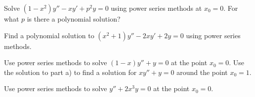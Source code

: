 \begin{exercise}
\leavevmode
\begin{tasks}
\task Solve $(1-x^2)y''-xy' + p^2y = 0$ using power series methods at $x_0=0$.
\task For what $p$ is there a polynomial solution?
\end{tasks}
\end{exercise}

\begin{exercise}
Find a polynomial solution to $(x^2+1) y''-2xy'+2y = 0$ using
power series methods.
\end{exercise}

\begin{exercise}
\leavevmode
\begin{tasks}
\task Use power series methods to solve $(1-x)y''+y = 0$ at the point $x_0 = 0$.
\task Use the solution to part a) to find a solution
for $xy''+y=0$ around the point $x_0=1$.
\end{tasks}
\end{exercise}

\setcounter{exercise}{100}

\begin{exercise}
Use power series methods to solve $y'' + 2 x^3 y = 0$ at the point $x_0 =
0$.
\end{exercise}

